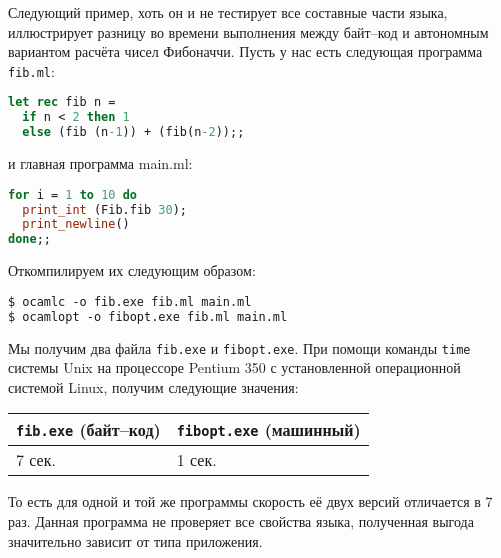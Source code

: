 Следующий пример, хоть он и не тестирует все составные части языка, иллюстрирует
разницу во времени выполнения между байт--код и автономным вариантом расчёта
чисел Фибоначчи. Пусть у нас есть следующая программа \texttt{fib.ml}:

\begin{lstlisting}[language=OCaml]
let rec fib n =
  if n < 2 then 1
  else (fib (n-1)) + (fib(n-2));;
\end{lstlisting}

и главная программа main.ml:

\begin{lstlisting}[language=OCaml]
for i = 1 to 10 do
  print_int (Fib.fib 30);
  print_newline()
done;;
\end{lstlisting}

Откомпилируем их следующим образом:

\begin{lstlisting}[language=OCaml]
$ ocamlc -o fib.exe fib.ml main.ml
$ ocamlopt -o fibopt.exe fib.ml main.ml
\end{lstlisting}

Мы получим два файла \texttt{fib.exe} и \texttt{fibopt.exe}. При помощи команды
\texttt{time} системы Unix на процессоре Pentium 350 с установленной
операционной системой Linux, получим следующие значения:

\begin{tabular}{|l|l|}
\hline
\texttt{fib.exe} (байт--код) & \texttt{fibopt.exe} (машинный) \\
\hline
7 сек. & 1 сек. \\
\hline
\end{tabular}

То есть для одной и той же программы скорость её двух версий отличается в 7 раз.
Данная программа не проверяет все свойства языка, полученная выгода значительно
зависит от типа приложения.